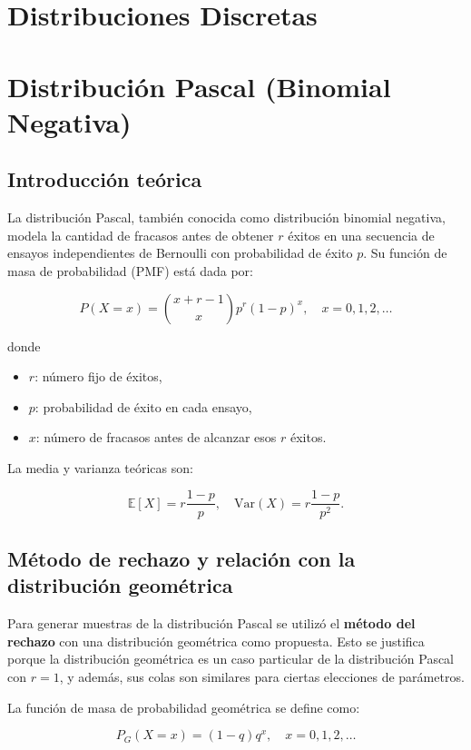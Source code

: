 \documentclass{article}
\begin{document}
\section{Distribuciones Discretas}

\section{Distribución Pascal (Binomial Negativa)}

\subsection{Introducción teórica}

La distribución Pascal, también conocida como distribución binomial negativa, modela la cantidad de fracasos antes de obtener $r$ éxitos en una secuencia de ensayos independientes de Bernoulli con probabilidad de éxito $p$. Su función de masa de probabilidad (PMF) está dada por:

\[
P(X = x) = \binom{x+r-1}{x} p^r (1-p)^x, \quad x = 0, 1, 2, \ldots
\]

donde
\begin{itemize}
    \item $r$: número fijo de éxitos,
    \item $p$: probabilidad de éxito en cada ensayo,
    \item $x$: número de fracasos antes de alcanzar esos $r$ éxitos.
\end{itemize}

La media y varianza teóricas son:

\[
\mathbb{E}[X] = r \frac{1-p}{p}, \quad \mathrm{Var}(X) = r \frac{1-p}{p^2}.
\]

\subsection{Método de rechazo y relación con la distribución geométrica}

Para generar muestras de la distribución Pascal se utilizó el \textbf{método del rechazo} con una distribución geométrica como propuesta. Esto se justifica porque la distribución geométrica es un caso particular de la distribución Pascal con $r=1$, y además, sus colas son similares para ciertas elecciones de parámetros.

La función de masa de probabilidad geométrica se define como:

\[
P_G(X = x) = (1 - q) q^x, \quad x=0,1,2,\ldots
\]
\end{document}
